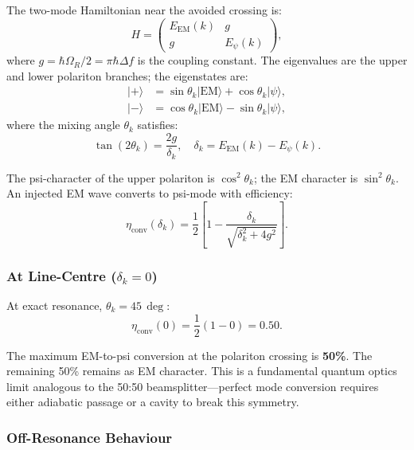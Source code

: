 \documentclass[aps,prd,twocolumn,superscriptaddress]{revtex4-2}
\begin{document}
The two-mode Hamiltonian near the avoided crossing is:
\begin{equation}
H = \begin{pmatrix} E_\mathrm{EM}(k) & g \\ g & E_\psi(k) \end{pmatrix},
\label{eq:Hamiltonian}
\end{equation}
where $g = \hbar\Omega_R/2 = \pi\hbar\Delta f$ is the coupling constant.
The eigenvalues are the upper and lower polariton branches; the
eigenstates are:
\begin{align}
|+\rangle &= \sin\theta_k|\mathrm{EM}\rangle + \cos\theta_k|\psi\rangle,
\label{eq:upper_polariton}\\
|-\rangle &= \cos\theta_k|\mathrm{EM}\rangle - \sin\theta_k|\psi\rangle,
\label{eq:lower_polariton}
\end{align}
where the mixing angle $\theta_k$ satisfies:
\begin{equation}
\tan(2\theta_k) = \frac{2g}{\delta_k},
\quad \delta_k = E_\mathrm{EM}(k) - E_\psi(k).
\label{eq:mixing_angle}
\end{equation}

The psi-character of the upper polariton is $\cos^2\theta_k$;
the EM character is $\sin^2\theta_k$.  An injected EM wave
converts to psi-mode with efficiency:
\begin{equation}
\boxed{
\eta_\mathrm{conv}(\delta_k) = \frac{1}{2}\left[1 - \frac{\delta_k}{\sqrt{\delta_k^2 + 4g^2}}\right].
}
\label{eq:eta_conv}
\end{equation}

\subsubsection{At Line-Centre ($\delta_k = 0$)}

At exact resonance, $\theta_k = 45\,\deg$:
\begin{equation}
\eta_\mathrm{conv}(0) = \frac{1}{2}(1 - 0) = 0.50.
\label{eq:eta_conv_resonance}
\end{equation}

The maximum EM-to-psi conversion at the polariton crossing is
\textbf{50\%}.  The remaining 50\% remains as EM character.
This is a fundamental quantum optics limit analogous to the
50:50 beamsplitter---perfect mode conversion requires either
adiabatic passage or a cavity to break this symmetry.

\subsubsection{Off-Resonance Behaviour}
\end{document}
